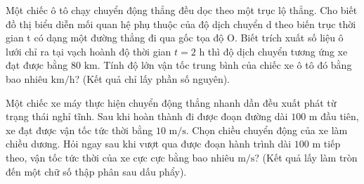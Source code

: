 \begin{ex}%
	Một chiếc ô tô chạy chuyển động thẳng đều dọc theo một trục lộ thẳng. Cho biết đồ thị biểu diễn mối quan hệ phụ thuộc của độ dịch chuyển d theo biến trục thời gian t có dạng một đường thẳng đi qua gốc tọa độ O. Biết trích xuất số liệu ô lưới chỉ ra tại vạch hoành độ thời gian $t = 2\text{ h}$ thì độ dịch chuyển tương ứng xe đạt được bằng $80\text{ km}$. Tính độ lớn vận tốc trung bình của chiếc xe ô tô đó bằng bao nhiêu $\text{km/h}$? (Kết quả chỉ lấy phần số nguyên).
\end{ex}

\begin{ex}%
	Một chiếc xe máy thực hiện chuyển động thẳng nhanh dần đều xuất phát từ trạng thái nghỉ tĩnh. Sau khi hoàn thành đi được đoạn đường dài $100\text{ m}$ đầu tiên, xe đạt được vận tốc tức thời bằng $10\text{ m/s}$. Chọn chiều chuyển động của xe làm chiều dương. Hỏi ngay sau khi vượt qua được đoạn hành trình dài $100\text{ m}$ tiếp theo, vận tốc tức thời của xe cực cực bằng bao nhiêu $\text{m/s}$? (Kết quả lấy làm tròn đến một chữ số thập phân sau dấu phẩy).
\end{ex}

